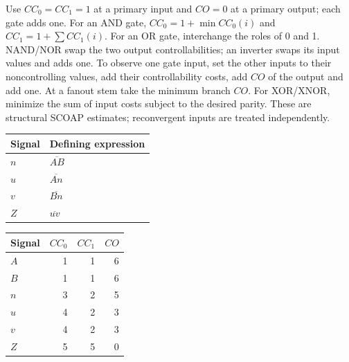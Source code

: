 \documentclass[11pt]{article}
\begin{document}
Use $CC_0=CC_1=1$ at a primary input and $CO=0$ at a primary output;
each gate adds one. For an AND gate,
$CC_0=1+\min CC_0(i)$ and $CC_1=1+\sum CC_1(i)$.
For an OR gate, interchange the roles of 0 and 1.
NAND/NOR swap the two output controllabilities; an inverter swaps its input
values and adds one. To observe one gate input, set the other inputs to their
noncontrolling values, add their controllability costs, add $CO$ of the output
and add one. At a fanout stem take the minimum branch $CO$.
For XOR/XNOR, minimize the sum of input costs subject to the desired parity.
These are structural SCOAP estimates; reconvergent inputs are treated independently.
\begin{center}\begin{tabular}{ll}\toprule Signal & Defining expression\\\midrule
$n$ & $\overline{AB}$\\
$u$ & $\overline{An}$\\
$v$ & $\overline{Bn}$\\
$Z$ & $\overline{uv}$\\
\bottomrule\end{tabular}\end{center}
\begin{center}\end{center}
\begin{center}\begin{tabular}{lrrr}\toprule
Signal & $CC_0$ & $CC_1$ & $CO$\\\midrule
$A$ & 1 & 1 & 6\\
$B$ & 1 & 1 & 6\\
$n$ & 3 & 2 & 5\\
$u$ & 4 & 2 & 3\\
$v$ & 4 & 2 & 3\\
$Z$ & 5 & 5 & 0\\
\bottomrule\end{tabular}\end{center}
\end{document}
